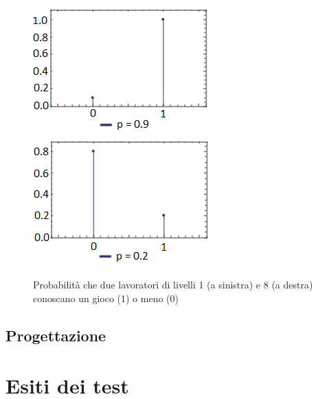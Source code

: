      \begin{figure}[!htb]
         \begin{widepage}
             \centering
             \includegraphics[width=.49\textwidth]{../immagini/livello_1.png}\hfil
             \includegraphics[width=.49\textwidth]{../immagini/livello_8.png}
             \caption{Probabilità che due lavoratori di livelli 1 (a sinistra) e 8 (a destra) conoscano un gioco (1) o meno (0)}
         \end{widepage}
     \end{figure}
 \clearpage
\subsection{Progettazione}
\section{Esiti dei test}